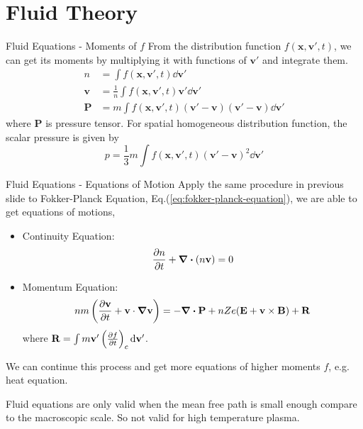 \section{Fluid Theory}
\begin{frame}{Fluid Equations - Moments of $f$}
    From the distribution function $f(\mathbf{x},\mathbf{v}',t)$, we can get its moments by multiplying it with functions of $\mathbf{v}'$ and integrate them.
    \begin{equation}
        \begin{aligned}
            n          & = \int f(\mathbf{x},\mathbf{v}',t)\dd{\mathbf{v}'}                                \\
            \mathbf{v} & = \frac{1}{n}\int f(\mathbf{x},\mathbf{v}',t)\mathbf{v}'\dd{\mathbf{v}'}          \\
            \mathbf{P} & = m\int f(\mathbf{x},\mathbf{v}',t)(\mathbf{v'-v})(\mathbf{v'-v})\dd{\mathbf{v}'}
        \end{aligned}
        \label{eq:distribution-moments}
    \end{equation}
    where $\mathbf{P}$ is pressure tensor. For spatial homogeneous distribution function, the scalar pressure is given by
    \begin{equation}
        p = \frac{1}{3}m\int f(\mathbf{x},\mathbf{v}',t)(\mathbf{v'-v})^2\dd{\mathbf{v}'}
        \label{eq:scalar-pressure}
    \end{equation}
\end{frame}

\begin{frame}{Fluid Equations - Equations of Motion}
    Apply the same procedure in previous slide to Fokker-Planck Equation, Eq.(\ref{eq:fokker-planck-equation}), we are able to get equations of motions,
    \begin{itemize}
        \item Continuity Equation:
              \begin{equation}
                  \pdv{n}{t} + \div(n\mathbf{v}) = 0
                  \label{eq:conservation-of-density}
              \end{equation}
        \item Momentum Equation:
              \begin{equation}
                  nm\left( \pdv{\mathbf{v}}{t} + \mathbf{v}\cdot\grad\mathbf{v} \right) = -\div\mathbf{P} + nZe(\mathbf{E+v\times B}) + \mathbf{R}
                  \label{eq:conservation-of-momentum}
              \end{equation}
              where $\mathbf{R} = \int m\mathbf{v'}\left(\pdv{f}{t}\right)_c\dd{\mathbf{v'}}$.
    \end{itemize}
    We can continue this process and get more equations of higher moments $f$, e.g. heat equation.

    Fluid equations are only valid when the mean free path is small enough compare to the macroscopic scale. So not valid for high temperature plasma.
\end{frame}


